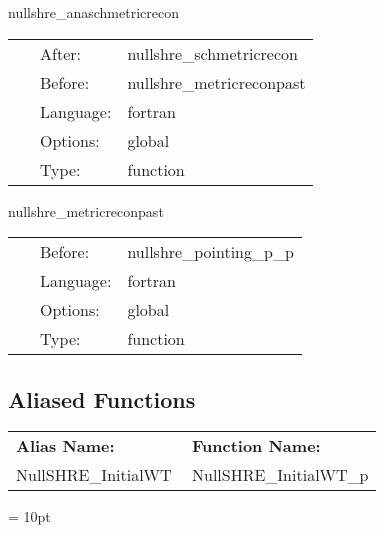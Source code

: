 \hspace{5mm} nullshre\_anaschmetricrecon 

\hspace{5mm}{\it analytic schwarzchild metric and its derivatives on the sphere } 


\hspace{5mm}

 \begin{tabular*}{160mm}{cll} 
~ & After:  & nullshre\_schmetricrecon \\ 
~ & Before:  & nullshre\_metricreconpast \\ 
~ & Language:  & fortran \\ 
~ & Options:  & global \\ 
~ & Type:  & function \\ 
\end{tabular*} 


\vspace{5mm}


\hspace{5mm} nullshre\_metricreconpast 

\hspace{5mm}{\it copy current metric to past levels } 


\hspace{5mm}

 \begin{tabular*}{160mm}{cll} 
~ & Before:  & nullshre\_pointing\_p\_p \\ 
~ & Language:  & fortran \\ 
~ & Options:  & global \\ 
~ & Type:  & function \\ 
\end{tabular*} 


\subsection*{Aliased Functions}

\hspace{5mm}

 \begin{tabular*}{160mm}{ll} 

{\bf Alias Name:} ~~~~~~~ & {\bf Function Name:} \\ 
NullSHRE\_InitialWT & NullSHRE\_InitialWT\_p \\ 
\end{tabular*} 



\vspace{5mm}\parskip = 10pt 

